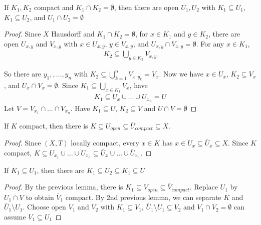 \begin{lemma}
	If $K_{1}, K_{2}$ compact and $K_{1} \cap K_2 = \emptyset$, then there are open $U_{1} , U_{2}$ with $K_{1} \subseteq U_{1}$, $K_{1} \subseteq U_{2}$, and $U_1 \cap U_2 = \emptyset$
\end{lemma}

\begin{proof}
	Since $X$ Hausdorff and $K_1 \cap K_2 = \emptyset$, for $x \in K_1$ and $y \in K_2$,
	there are open $U_{x,y}$ and $V_{x,y}$ with $x \in U_{x,y}$, $y \in V_{x,y}$,
	and $U_{x,y} \cap V_{x,y} = \emptyset$. For any $x \in K_1$,
	\begin{align*}
		K_2 \subseteq \bigcup_{y \in K_2} V_{x,y}
	\end{align*}

	So there are $y_1, ,\ldots , y_n$ with $K_2 \subseteq \bigcup_{k=1}^n V_{x, y_{k}} = V_{x}$.
	Now we have $x \in U_{x}$, $K_2 \subseteq V_x$, and $U_{x} \cap V_{x} = \emptyset$. Since $K_{1} \subseteq \bigcup_{x \in K_1} V_x$, have
	\begin{align*}
		K_1 \subseteq U_{x} \cup \ldots \cup U_{x_{n}} = U
	\end{align*}
	Let $V = V_{x_{1}} \cap \ldots \cap V_{x_{n}}$. Have $K_{1} \subseteq U$, $K_{2} \subseteq V$ and $U \cap V = \emptyset$
\end{proof}

\begin{lemma}
	If $K$ compact, then there is $K \subseteq U_{open} \subseteq \bar{U}_{compact} \subseteq X$.
\end{lemma}

\begin{proof}
	Since $(X,T)$ locally compact, every $x \in K$ has $x \in U_{x} \subseteq \bar{U}_x \subseteq X$.
	Since $K$ compact, $K \subseteq U_{x_1} \cup \ldots \cup U_{x_n} \subseteq \bar{U}_x \cup \ldots \cup \bar{U}_{x_{n}}$.
\end{proof}

\begin{lemma}
	If $K_1 \subseteq U_1$, then there are  $K_1 \subseteq U_{2} \subseteq K_1 \subseteq U$
\end{lemma}

\begin{proof}
	By the previous lemma, there is $K_1 \subseteq V_{open} \subseteq \bar{V}_{compact}$.
	Replace $U_{1}$ by $U_{1} \cap V$ to obtain $\bar{V}_{1}$ compact. By 2nd previous lemma, we can separate $K$ and $\bar{U}_1 \setminus U_{1}$.
	Choose open $V_1$ and $V_2$ with $K_{1} \subseteq V_{1}$,  $\bar{U}_1 \setminus U_1 \subseteq V_{2}$
	and $V_{1} \cap V_{2} = \emptyset$ can assume $V_{1} \subseteq U_{1}$
\end{proof}


